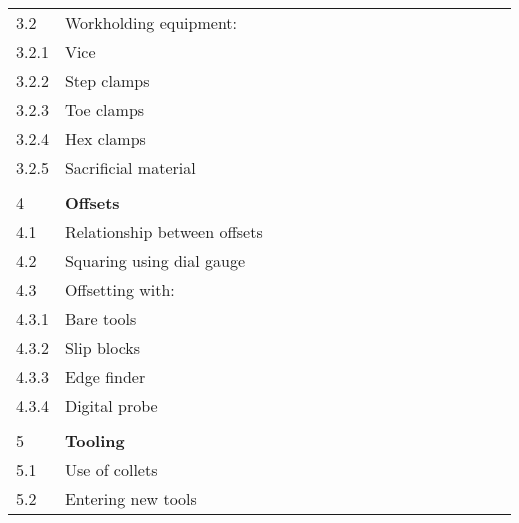 \documentclass[a5paper]{article}
\begin{document}
\begin{tabularx}{\textwidth}{|l|X|c|c|c|c|c|c|c|c|c|c|c|c|c|c|c|}
    & & & & & & & & & & & & & & & \\ \hline
    3.2 & Workholding equipment:
    & \multicolumn{15}{c|}{} \\ \hline
    3.2.1 & \hspace{5mm} Vice
    & & & & & & & & & & & & & & & \\ \hline
    3.2.2 & \hspace{5mm} Step clamps
    & & & & & & & & & & & & & & & \\ \hline
    3.2.3 & \hspace{5mm} Toe clamps
    & & & & & & & & & & & & & & & \\ \hline
    3.2.4 & \hspace{5mm} Hex clamps 
    & & & & & & & & & & & & & & & \\ \hline
    3.2.5 & \hspace{5mm} Sacrificial material
    & & & & & & & & & & & & & & & \\ \hline
    & \multicolumn{16}{c|}{} \\
    4 & \multicolumn{1}{l}{\textbf{Offsets}} & \multicolumn{15}{c|}{} \\
    \hline
    4.1 & Relationship between offsets
    & & & & & & & & & & & & & & & \\ \hline
    4.2 & Squaring using dial gauge
    & & & & & & & & & & & & & & & \\ \hline
    4.3 & Offsetting with:
    & \multicolumn{15}{c|}{} \\ \hline
    4.3.1 & \hspace{5mm} Bare tools
    & & & & & & & & & & & & & & & \\ \hline
    4.3.2 & \hspace{5mm} Slip blocks
    & & & & & & & & & & & & & & & \\ \hline
    4.3.3 & \hspace{5mm} Edge finder
    & & & & & & & & & & & & & & & \\ \hline
    4.3.4 & \hspace{5mm} Digital probe
    & & & & & & & & & & & & & & & \\ \hline
    & \multicolumn{16}{c|}{} \\
    5 & \multicolumn{1}{l}{\textbf{Tooling}} & \multicolumn{15}{c|}{} \\
    \hline
    5.1 & Use of collets
    & & & & & & & & & & & & & & & \\ \hline
    5.2 & Entering new tools
    & & & & & & & & & & & & & & & \\ \hline

\end{tabularx}
\end{document}
